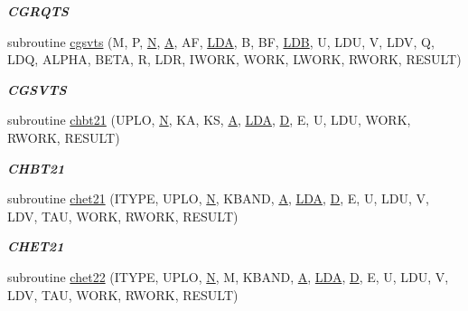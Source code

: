 \begin{DoxyCompactItemize}
\begin{DoxyCompactList}\small\item\em {\bfseries C\+G\+R\+Q\+T\+S} \end{DoxyCompactList}\item 
subroutine \hyperlink{group__complex__eig_ga5d7553f6e0d22cd4f061e493c45d2ff5}{cgsvts} (M, P, \hyperlink{polmisc_8c_a0240ac851181b84ac374872dc5434ee4}{N}, \hyperlink{classA}{A}, A\+F, \hyperlink{example__user_8c_ae946da542ce0db94dced19b2ecefd1aa}{L\+D\+A}, B, B\+F, \hyperlink{example__user_8c_a50e90a7104df172b5a89a06c47fcca04}{L\+D\+B}, U, L\+D\+U, V, L\+D\+V, Q, L\+D\+Q, A\+L\+P\+H\+A, B\+E\+T\+A, R, L\+D\+R, I\+W\+O\+R\+K, W\+O\+R\+K, L\+W\+O\+R\+K, R\+W\+O\+R\+K, R\+E\+S\+U\+L\+T)
\begin{DoxyCompactList}\small\item\em {\bfseries C\+G\+S\+V\+T\+S} \end{DoxyCompactList}\item 
subroutine \hyperlink{group__complex__eig_ga96644c54365d8da1b272d9ad4412d38f}{chbt21} (U\+P\+L\+O, \hyperlink{polmisc_8c_a0240ac851181b84ac374872dc5434ee4}{N}, K\+A, K\+S, \hyperlink{classA}{A}, \hyperlink{example__user_8c_ae946da542ce0db94dced19b2ecefd1aa}{L\+D\+A}, \hyperlink{odrpack_8h_a7dae6ea403d00f3687f24a874e67d139}{D}, E, U, L\+D\+U, W\+O\+R\+K, R\+W\+O\+R\+K, R\+E\+S\+U\+L\+T)
\begin{DoxyCompactList}\small\item\em {\bfseries C\+H\+B\+T21} \end{DoxyCompactList}\item 
subroutine \hyperlink{group__complex__eig_ga25f6db849fd0d68eaa2e68917e36a38e}{chet21} (I\+T\+Y\+P\+E, U\+P\+L\+O, \hyperlink{polmisc_8c_a0240ac851181b84ac374872dc5434ee4}{N}, K\+B\+A\+N\+D, \hyperlink{classA}{A}, \hyperlink{example__user_8c_ae946da542ce0db94dced19b2ecefd1aa}{L\+D\+A}, \hyperlink{odrpack_8h_a7dae6ea403d00f3687f24a874e67d139}{D}, E, U, L\+D\+U, V, L\+D\+V, T\+A\+U, W\+O\+R\+K, R\+W\+O\+R\+K, R\+E\+S\+U\+L\+T)
\begin{DoxyCompactList}\small\item\em {\bfseries C\+H\+E\+T21} \end{DoxyCompactList}\item 
subroutine \hyperlink{group__complex__eig_ga0d76f9028abf55ff509d2fb0a58ed763}{chet22} (I\+T\+Y\+P\+E, U\+P\+L\+O, \hyperlink{polmisc_8c_a0240ac851181b84ac374872dc5434ee4}{N}, M, K\+B\+A\+N\+D, \hyperlink{classA}{A}, \hyperlink{example__user_8c_ae946da542ce0db94dced19b2ecefd1aa}{L\+D\+A}, \hyperlink{odrpack_8h_a7dae6ea403d00f3687f24a874e67d139}{D}, E, U, L\+D\+U, V, L\+D\+V, T\+A\+U, W\+O\+R\+K, R\+W\+O\+R\+K, R\+E\+S\+U\+L\+T)

\end{DoxyCompactItemize}
